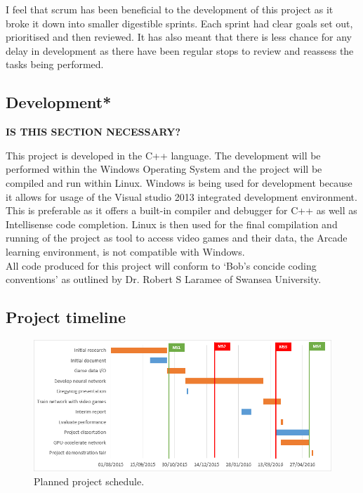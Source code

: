 \documentclass[10pt]{article}
\begin{document}
		I feel that scrum has been beneficial to the development of this project as it broke it down into smaller digestible sprints. Each sprint had clear goals set out, prioritised and then reviewed. It has also meant that there is less chance for any delay in development as there have been regular stops to review and reassess the tasks being performed.
	
	\bigskip
	
	\subsection{Development*}
	
	\textbf{IS THIS SECTION NECESSARY?}
	
	This project is developed in the C++ language. The development will be performed within the Windows Operating System and the project will be compiled and run within Linux. Windows is being used for development because it allows for usage of the Visual studio 2013 integrated development environment. This is preferable as it offers a built-in compiler and debugger for C++ as well as Intellisense code completion. Linux is then used for the final compilation and running of the project as tool to access video games and their data, the Arcade learning environment, is not compatible with Windows.\\
	
	All code produced for this project will conform to `Bob's concide coding conventions' \cite{bc3} as outlined by Dr. Robert S Laramee of Swansea University.\\
	
	\bigskip
	
	\subsection{Project timeline}
	
		\begin{figure}[h]				
			\includegraphics[scale=0.6]{img/newSchedule}
			\centering
			\caption{Planned project schedule.}
			\label{fig:newSchedule}
		\end{figure}
		
\end{document}
